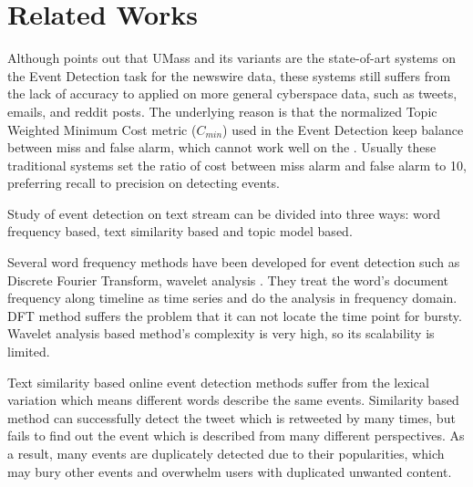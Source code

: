 \documentclass{sig-alternate-05-2015}
\begin{document}
\section{Related Works}
Although \cite{Wurzer:2015wq} points out that UMass\cite{Allan:2000wu} and its variants\cite{Petrovic:2010uj}\cite{petrovic2012using}\cite{Wurzer:2015wq} are the state-of-art systems on the Event Detection task for the newswire data, these systems still suffers from the lack of accuracy to applied on more general cyberspace data, such as tweets, emails, and reddit posts. 
The underlying reason is that the normalized Topic Weighted Minimum Cost metric (\(C_{min}\)) used in the Event Detection keep balance between miss and false alarm, which cannot work well on the .
Usually these traditional systems set the ratio of cost between miss alarm and false alarm to 10, preferring recall to precision on detecting events.

Study of event detection on text stream can be divided into three ways: word frequency based, text similarity based and topic model based.

Several word frequency methods have been developed for event detection such as Discrete Fourier Transform\cite{he2007analyzingDFT}, wavelet analysis \cite{weng2011eventWavelet}.
They treat the word's document frequency along timeline as time series and do the analysis in frequency domain. 
DFT method suffers the problem that it can not locate the time point for bursty.
Wavelet analysis based method's complexity is very high, so its scalability is limited. 

 Text similarity based online event detection methods\cite{petrovic2010streaming}\cite{mccreadiescalable}  suffer from the lexical variation which means different words describe the same events.
 Similarity based method can successfully detect the tweet which is retweeted by many times, but fails to find out the event which is described from many different perspectives.
 As a result, many events are duplicately detected due to their popularities, which may bury other events and overwhelm users with duplicated unwanted content.
\end{document}
